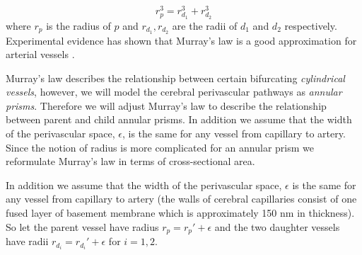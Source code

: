 \documentclass[12pt]{article} %
\theoremstyle{definition}
\begin{document}
\[r_{p}^{3} = r_{d_{1}}^{3} + r_{d_{2}}^{3}\]
where $r_{p}$ is the radius of $p$ and $r_{d_{1}},r_{d_{2}}$ are the radii of $d_{1}$ and 
$d_{2}$ respectively.
Experimental evidence has shown that Murray's law is a good approximation for 
arterial vessels \cite{Zamir,cohn}.

Murray's law describes the relationship between certain bifurcating  
\emph{cylindrical vessels}, however, we will model the cerebral perivascular pathways as \emph{annular prisms}.  Therefore we will adjust Murray's law to describe 
the relationship between parent and child annular prisms. In addition we assume that the width of the perivascular space, $\epsilon$, is the same for any vessel from capillary to
 artery. Since the notion of radius is more 
complicated for an annular prism we reformulate Murray's law in terms of 
cross-sectional area.   


In addition we assume that the width of the perivascular space, $\epsilon$ is the same for any vessel from capillary to
 artery (the walls of cerebral capillaries consist of one fused layer of basement membrane which is approximately 150 nm in thickness).  So let the parent vessel have radius $r_{p} = r_{p}' + \epsilon$ and the two 
daughter vessels have radii $r_{d_i} = r_{d_i}' + \epsilon$ for $i = 1,2$.

\end{document}
